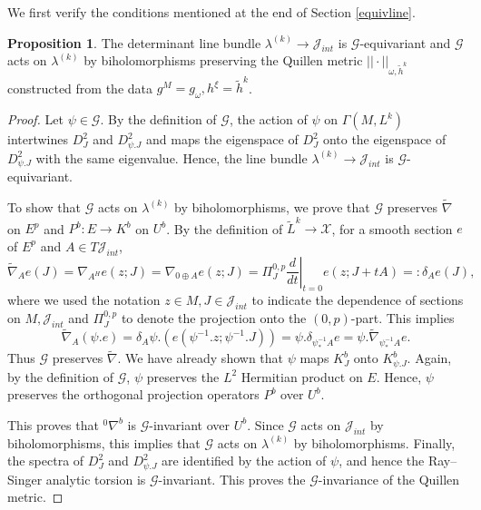 \documentclass[12pt,reqno,a4paper]{amsart}
\numberwithin{equation}{section}
\theoremstyle{definition}
\newtheorem{proposition}{Proposition}
\theoremstyle{remark}
\begin{document}
We first verify the conditions mentioned at the end of Section \ref{equivline}.
\begin{proposition}
The determinant line bundle $\lambda^{(k)}\rightarrow \mathcal{J}_{int}$ is $\mathcal{G}$-equivariant and $\mathcal{G}$ acts on $\lambda^{(k)}$ by biholomorphisms preserving the Quillen metric $||\cdot||_{\omega,\widetilde{h}^k}$ constructed from the data $g^M=g_\omega, h^\xi=\widetilde{h}^k$.
\end{proposition}

\begin{proof}
Let $\psi\in\mathcal{G}$. By the definition of $\mathcal{G}$, the action of $\psi$ on $\Gamma(M,L^k)$ intertwines $D^2_J$ and $D^2_{\psi.J}$ and maps the eigenspace of $D^2_J$ onto the eigenspace of $D^2_{\psi.J}$ with the same eigenvalue. Hence, the line bundle $\lambda^{(k)} \rightarrow \mathcal{J}_{int}$ is $\mathcal{G}$-equivariant. 

To show that $\mathcal{G}$ acts on $\lambda^{(k)}$ by biholomorphisms, we prove that $\mathcal{G}$ preserves $\widetilde{\nabla}$ on $E^p$ and $P^b:E\rightarrow K^b$ on $U^b$. By the definition of $\widetilde{L}^k\rightarrow\mathcal{X}$, for a smooth section $e$ of $E^p$ and $A\in T\mathcal{J}_{int}$,
\begin{equation*}
\widetilde{\nabla}_A e(J) = \nabla_{A^H} e(z;J)=\nabla_{0\oplus A}e(z;J)=\Pi_J^{0,p}\left.\frac{d}{dt}\right|_{t=0} e(z;J+tA)=:\delta_A e(J),
\end{equation*}
where we used the notation $z\in M, J\in \mathcal{J}_{int}$ to indicate the dependence of sections on $M,\mathcal{J}_{int}$ and $\Pi_J^{0,p}$ to denote the projection onto the $(0,p)$-part. This implies
\begin{equation*}
\widetilde{\nabla}_A (\psi.e)=\delta_A \psi.(e(\psi^{-1}.z;\psi^{-1}.J))=\psi. \delta_{\psi^{-1}_*A}e=\psi. \widetilde{\nabla}_{\psi^{-1}_*A}e.
\end{equation*}
Thus $\mathcal{G}$ preserves $\widetilde{\nabla}$. We have already shown that $\psi$ maps $K^b_J$ onto $K^b_{\psi.J}$. Again, by the definition of $\mathcal{G}$, $\psi$ preserves the $L^2$ Hermitian product on $E$. Hence, $\psi$ preserves the orthogonal projection operators $P^b$ over $U^b$. 

This proves that ${}^0\nabla^b$ is $\mathcal{G}$-invariant over $U^b$. Since $\mathcal{G}$ acts on $\mathcal{J}_{int}$ by biholomorphisms, this implies that $\mathcal{G}$ acts on $\lambda^{(k)}$ by biholomorphisms. Finally, the spectra of $D^2_J$ and $D^2_{\psi.J}$ are identified by the action of $\psi$, and hence the Ray--Singer analytic torsion is $\mathcal{G}$-invariant. This proves the $\mathcal{G}$-invariance of the Quillen metric.
\end{proof}
\end{document}

